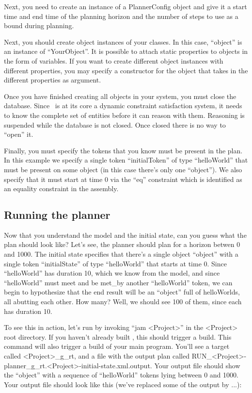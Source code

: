\documentclass[10pt, letterpaper, twoside]{article}
\begin{document}
Next, you need to create an instance of a PlannerConfig object and give it
a start time and end time of the planning horizon and the number of steps
to use as a bound during planning.  

Next, you should create object instances of your classes.  In this case,
``object'' is an instance of ``YourObject''.  It is possible to attach
static properties to objects in the form of variables.  If you want to
create different object instances with different properties, you may
specify a constructor for the object that takes in the different properties
as argument. 

Once you have finished creating all objects in your system, you must close
the database.  Since \ET\, is at its core a dynamic constraint satisfaction
system, it needs to know the complete set of entities before it can reason
with them.  Reasoning is suspended while the database is not closed.  Once
closed there is no way to ``open'' it.

Finally, you must specify the tokens that you know must be present in the
plan.  In this example we specify a single token ``initialToken'' of type
``helloWorld'' that must be present on some object (in this case there's
only one ``object'').  We also specify that it must start at time 0 via the
``eq'' constraint which is identified as an equality constraint in the
assembly. 

\subsection{Running the planner}
\label{execution}
Now that you understand the model and the initial state, can you guess what
the plan should look like?  Let's see, the planner should plan for a
horizon betwen 0 and 1000.  The initial state specifies that there's a
single object ``object'' with a single token ``initialState'' of type
``helloWorld'' that starts at time 0.  Since ``helloWorld'' has duration
10, which we know from the model, and since ``helloWorld'' must meet and be
met\_by another ``helloWorld'' token, we can begin to hypothesize that the
end result will be an ``object'' full of helloWorlds, all abutting each
other.  How many? Well, we should see 100 of them, since each has duration 10.

To see this in action, let's run by invoking ``jam <Project>'' in
the <Project> root directory.  If you haven't already built \ET, this
should trigger a build.  This command will also trigger a build of your
main program. You'll see a target called <Project>\_g\_rt, and a file with
the output plan called
RUN\_<Project>-planner\_g\_rt.<Project>-initial-state.xml.output.
Your output file should show the ``object'' with a sequence of
``helloWorld'' tokens lying between 0 and 1000. Your output file
should look like this (we've replaced some of the output by ...): 
\end{document}
